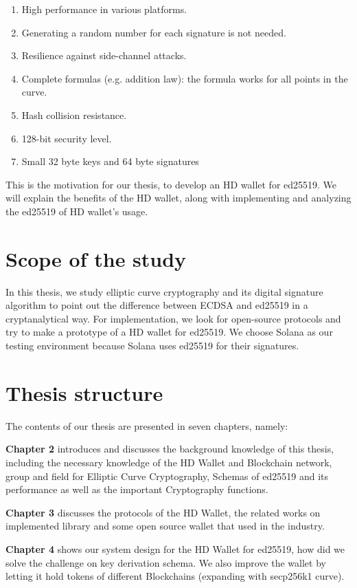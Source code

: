 \begin{enumerate}
    \item High performance in various platforms.   
    \item Generating a random number for each signature is not needed.
    \item Resilience against side-channel attacks.
    \item Complete formulas (e.g. addition law): the formula works for all points in the curve.
    \item Hash collision resistance.
    \item 128-bit security level.
    \item Small 32 byte keys and 64 byte signatures
\end{enumerate}
This is the motivation for our thesis, to develop an HD wallet for ed25519. We will explain the benefits of the HD wallet, along with implementing and analyzing the ed25519 of HD wallet’s usage. 

\section{Scope of the study}

In this thesis, we study elliptic curve cryptography and its digital signature algorithm to point out the difference between ECDSA and ed25519 in a cryptanalytical way. For implementation, we look for open-source protocols and try to make a prototype of a HD wallet for ed25519. We choose Solana as our testing environment because Solana uses ed25519 for their signatures.

\section{Thesis structure}

The contents of our thesis are presented in seven chapters, namely:

\textbf{Chapter 2} introduces and discusses the background knowledge of this thesis, including the necessary knowledge of the HD Wallet and Blockchain network, group and field for Elliptic Curve Cryptography, Schemas of ed25519 and its performance as well as the important Cryptography functions.

\textbf{Chapter 3} discusses the protocols of the HD Wallet, the related works on implemented library and some open source wallet that used in the industry. 

\textbf{Chapter 4} shows our system design for the HD Wallet for ed25519, how did we solve the challenge on key derivation schema. We also improve the wallet by letting it hold tokens of different Blockchains (expanding with secp256k1 curve).

